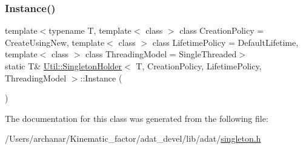 \subsubsection{\texorpdfstring{Instance()}{Instance()}\hspace{0.1cm}{\footnotesize\ttfamily [2/2]}}
{\footnotesize\ttfamily template$<$typename T, template$<$ class $>$ class Creation\+Policy = Create\+Using\+New, template$<$ class $>$ class Lifetime\+Policy = Default\+Lifetime, template$<$ class $>$ class Threading\+Model = Single\+Threaded$>$ \\
static T\& \mbox{\hyperlink{classUtil_1_1SingletonHolder}{Util\+::\+Singleton\+Holder}}$<$ T, Creation\+Policy, Lifetime\+Policy, Threading\+Model $>$\+::Instance (\begin{DoxyParamCaption}{ }\end{DoxyParamCaption})\hspace{0.3cm}{\ttfamily [static]}}



The documentation for this class was generated from the following file\+:\begin{DoxyCompactItemize}
\item 
/\+Users/archanar/\+Kinematic\+\_\+factor/adat\+\_\+devel/lib/adat/\mbox{\hyperlink{lib_2adat_2singleton_8h}{singleton.\+h}}\end{DoxyCompactItemize}
